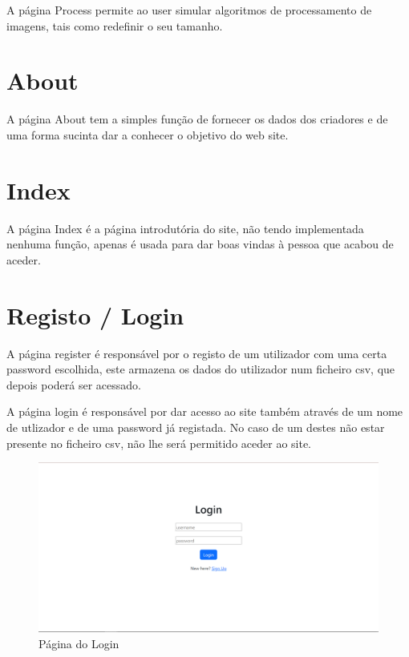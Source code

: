 \documentclass{report}
\begin{document}
    A página Process permite ao user simular algoritmos de processamento de imagens, tais como redefinir o seu tamanho.
    
\section{About}

    A página About tem a simples função de fornecer os dados dos criadores e de uma forma sucinta dar a conhecer o objetivo do web site.

\section{Index}

    A página Index é a página introdutória do site, não tendo implementada nenhuma função, apenas é usada para dar boas vindas à pessoa que acabou de aceder.
    
\section{Registo / Login} 

    A página register é responsável por o registo de um utilizador com uma certa password escolhida, este armazena os dados do utilizador num ficheiro csv, que depois poderá ser acessado.

    A página login é responsável por dar acesso ao site também através de um nome de utlizador e de uma password já registada. No caso de um destes não estar presente no ficheiro csv, não lhe será permitido aceder ao site. 
    \\
\begin{figure}[h]
    \centering
    \includegraphics[width=\textwidth]{LoginPage.png}
    \caption{Página do Login}
\end{figure}
\end{document}
